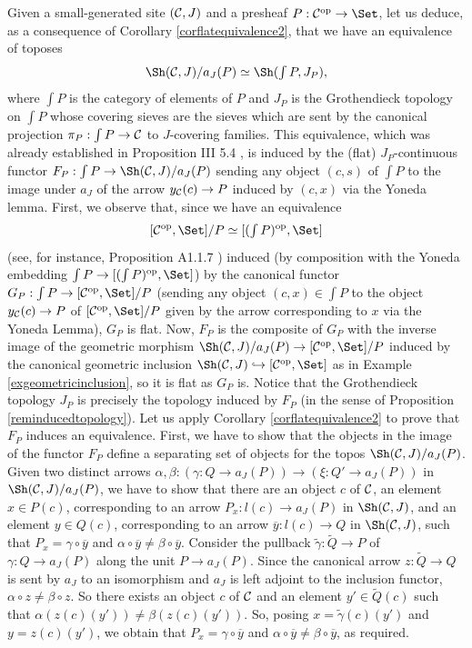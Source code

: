 \documentclass[a4paper,12pt]{article}
\begin{document}
Given a small-generated site $({\cal C}, J)$ and a presheaf $P:{\cal C}^{\textup{op}}\to \Set$, let us deduce, as a consequence of Corollary \ref{corflatequivalence2}, that we have an equivalence of toposes
\[
\Sh({\cal C}, J)\slash a_{J}(P)\simeq \Sh(\textstyle \int P, J_{P}),
\]
where $\int P$ is the category of elements of $P$ and $J_{P}$ is the Grothendieck topology on $\int P$ whose covering sieves are the sieves which are sent by the canonical projection $\pi_{P}:\int P \to {\cal C}$ to $J$-covering families. This equivalence, which was already established in Proposition III 5.4 \cite{grothendieck}, is induced by the (flat) $J_{P}$-continuous functor $F_{P}:\int P \to \Sh({\cal C}, J)\slash a_{J}(P)$ sending any object $(c, s)$ of $\int P$ to the image under $a_{J}$ of the arrow $y_{\cal C}(c)\to P$ induced by $(c, x)$ via the Yoneda lemma. First, we observe that, since we have an equivalence 
\[
[{\cal C}^{\textup{op}}, \Set]\slash P \simeq [({\textstyle \int P})^{\textup{op}}, \Set]
\]
(see, for instance, Proposition A1.1.7 \cite{El}) induced (by composition with the Yoneda embedding ${\int P}\to [({\int P})^{\textup{op}}, \Set]$) by the canonical functor $G_{P}:\int P\to [{\cal C}^{\textup{op}}, \Set]\slash P$ (sending any object $(c, x)\in \int P$ to the object $y_{\cal C}(c)\to P$ of $[{\cal C}^{\textup{op}}, \Set]\slash P$ given by the arrow corresponding to $x$ via the Yoneda Lemma), $G_{P}$ is flat. Now, $F_{P}$ is the composite of $G_{P}$ with the inverse image of the geometric morphism $\Sh({\cal C}, J)\slash a_{J}(P) \to [{\cal C}^{\textup{op}}, \Set]\slash P$ induced by the canonical geometric inclusion $\Sh({\cal C}, J)\hookrightarrow [{\cal C}^{\textup{op}}, \Set]$ as in Example \ref{exgeometricinclusion}, so it is flat as $G_{P}$ is. Notice that the Grothendieck topology $J_{P}$ is precisely the topology induced by $F_{P}$ (in the sense of Proposition \ref{reminducedtopology}).
Let us apply Corollary \ref{corflatequivalence2} to prove that $F_{P}$ induces an equivalence. First, we have to show that the objects in the image of the functor $F_{P}$ define a separating set of objects for the topos $\Sh({\cal C}, J)\slash a_{J}(P)$. Given two distinct arrows $\alpha, \beta:(\gamma:Q\to a_{J}(P))\to (\xi:Q'\to a_{J}(P))$ in $\Sh({\cal C}, J)\slash a_{J}(P)$, we have to show that there are an object $c$ of $\cal C$, an element $x\in P(c)$, corresponding to an arrow $P_{x}:l(c)\to a_{J}(P)$ in $\Sh({\cal C}, J)$, and an element $y\in Q(c)$, corresponding to an arrow $\overline{y}:l(c)\to Q$ in $\Sh({\cal C}, J)$, such that $P_{x}=\gamma \circ \overline{y}$ and $\alpha\circ \overline{y}\neq \beta\circ \overline{y}$. Consider the pullback $\tilde{\gamma}:\tilde{Q}\to P$ of $\gamma:Q\to a_{J}(P)$ along the unit $P\to a_{J}(P)$. Since the canonical arrow $z:\tilde{Q}\to Q$ is sent by $a_{J}$ to an isomorphism and $a_{J}$ is left  adjoint to the inclusion functor, $\alpha\circ z\neq \beta \circ z$. So there exists an object $c$ of $\cal C$ and an element $y'\in \tilde{Q}(c)$ such that $\alpha(z(c)(y'))\neq \beta(z(c)(y'))$. So, posing $x=\tilde{\gamma}(c)(y')$ and $y=z(c)(y')$, we obtain that $P_{x}=\gamma \circ \overline{y}$ and $\alpha\circ \overline{y}\neq \beta\circ \overline{y}$, as required. 
\end{document}
